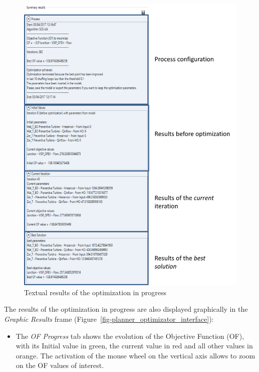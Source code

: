 \documentclass[
  letterpaper,
  DIV=11,
  numbers=noendperiod]{scrreprt}
\providecommand{\tightlist}{%
  \setlength{\itemsep}{0pt}\setlength{\parskip}{0pt}}\usepackage{longtable,booktabs,array}
\begin{document}
\begin{figure}

{\centering \includegraphics{./figures/fig-planner_optimizator_text_results.png}

}

\caption{\label{fig-planner_optimizator_text_results}Textual results of
the optimization in progress}

\end{figure}

The results of the optimization in progress are also displayed
graphically in the \emph{Graphic} \emph{Results} frame
(Figure~\ref{fig-planner_optimizator_interface}):

\begin{itemize}
\tightlist
\item
  The \emph{OF Progress} tab shows the evolution of the Objective
  Function (OF), with its Initial value in green, the current value in
  red and all other values in orange. The activation of the mouse wheel
  on the vertical axis allows to zoom on the OF values of interest.
\end{itemize}
\end{document}
